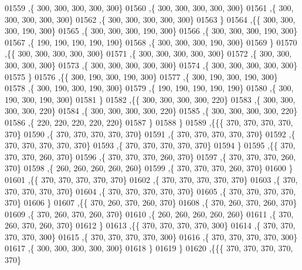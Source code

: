 \begin{DoxyCode}
01559    ,\{   300,   300,   300,   300,   300\}
01560    ,\{   300,   300,   300,   300,   300\}
01561    ,\{   300,   300,   300,   300,   300\}
01562    ,\{   300,   300,   300,   300,   300\}
01563    \}
01564   ,\{\{   300,   300,   300,   190,   300\}
01565    ,\{   300,   300,   300,   190,   300\}
01566    ,\{   300,   300,   300,   190,   300\}
01567    ,\{   190,   190,   190,   190,   190\}
01568    ,\{   300,   300,   300,   190,   300\}
01569    \}
01570   ,\{\{   300,   300,   300,   300,   300\}
01571    ,\{   300,   300,   300,   300,   300\}
01572    ,\{   300,   300,   300,   300,   300\}
01573    ,\{   300,   300,   300,   300,   300\}
01574    ,\{   300,   300,   300,   300,   300\}
01575    \}
01576   ,\{\{   300,   190,   300,   190,   300\}
01577    ,\{   300,   190,   300,   190,   300\}
01578    ,\{   300,   190,   300,   190,   300\}
01579    ,\{   190,   190,   190,   190,   190\}
01580    ,\{   300,   190,   300,   190,   300\}
01581    \}
01582   ,\{\{   300,   300,   300,   300,   220\}
01583    ,\{   300,   300,   300,   300,   220\}
01584    ,\{   300,   300,   300,   300,   220\}
01585    ,\{   300,   300,   300,   300,   220\}
01586    ,\{   220,   220,   220,   220,   220\}
01587    \}
01588   \}
01589  ,\{\{\{   370,   370,   370,   370,   370\}
01590    ,\{   370,   370,   370,   370,   370\}
01591    ,\{   370,   370,   370,   370,   370\}
01592    ,\{   370,   370,   370,   370,   370\}
01593    ,\{   370,   370,   370,   370,   370\}
01594    \}
01595   ,\{\{   370,   370,   370,   260,   370\}
01596    ,\{   370,   370,   370,   260,   370\}
01597    ,\{   370,   370,   370,   260,   370\}
01598    ,\{   260,   260,   260,   260,   260\}
01599    ,\{   370,   370,   370,   260,   370\}
01600    \}
01601   ,\{\{   370,   370,   370,   370,   370\}
01602    ,\{   370,   370,   370,   370,   370\}
01603    ,\{   370,   370,   370,   370,   370\}
01604    ,\{   370,   370,   370,   370,   370\}
01605    ,\{   370,   370,   370,   370,   370\}
01606    \}
01607   ,\{\{   370,   260,   370,   260,   370\}
01608    ,\{   370,   260,   370,   260,   370\}
01609    ,\{   370,   260,   370,   260,   370\}
01610    ,\{   260,   260,   260,   260,   260\}
01611    ,\{   370,   260,   370,   260,   370\}
01612    \}
01613   ,\{\{   370,   370,   370,   370,   300\}
01614    ,\{   370,   370,   370,   370,   300\}
01615    ,\{   370,   370,   370,   370,   300\}
01616    ,\{   370,   370,   370,   370,   300\}
01617    ,\{   300,   300,   300,   300,   300\}
01618    \}
01619   \}
01620  ,\{\{\{   370,   370,   370,   370,   370\}

\end{DoxyCode}
